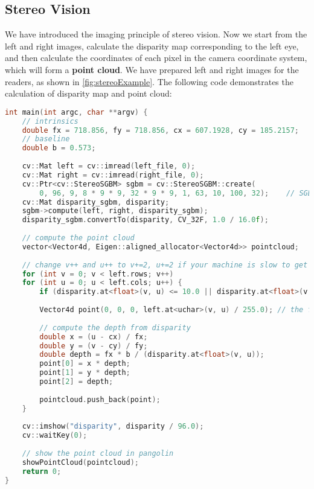 \subsection{Stereo Vision}
We have introduced the imaging principle of stereo vision. Now we start from the left and right images, calculate the disparity map corresponding to the left eye, and then calculate the coordinates of each pixel in the camera coordinate system, which will form a \textbf{point cloud}. We have prepared left and right images for the readers, as shown in \autoref {fig:stereoExample}. The following code demonstrates the calculation of disparity map and point cloud:

\begin{lstlisting}[language=C++,caption=slambook/ch5/stereoVision/stereoVision.cpp (Part)]
int main(int argc, char **argv) {
    // intrinsics
    double fx = 718.856, fy = 718.856, cx = 607.1928, cy = 185.2157;
    // baseline
    double b = 0.573;
    
    cv::Mat left = cv::imread(left_file, 0);
    cv::Mat right = cv::imread(right_file, 0);
    cv::Ptr<cv::StereoSGBM> sgbm = cv::StereoSGBM::create(
        0, 96, 9, 8 * 9 * 9, 32 * 9 * 9, 1, 63, 10, 100, 32);    // SGBM is senstive to parameters
    cv::Mat disparity_sgbm, disparity;
    sgbm->compute(left, right, disparity_sgbm);
    disparity_sgbm.convertTo(disparity, CV_32F, 1.0 / 16.0f);
    
    // compute the point cloud
    vector<Vector4d, Eigen::aligned_allocator<Vector4d>> pointcloud;
    
    // change v++ and u++ to v+=2, u+=2 if your machine is slow to get a sparser cloud
    for (int v = 0; v < left.rows; v++)
    for (int u = 0; u < left.cols; u++) {
        if (disparity.at<float>(v, u) <= 10.0 || disparity.at<float>(v, u) >= 96.0) continue;
        
        Vector4d point(0, 0, 0, left.at<uchar>(v, u) / 255.0); // the first three dimensions are xyz, the 4-th is the color
        
        // compute the depth from disparity
        double x = (u - cx) / fx;
        double y = (v - cy) / fy;
        double depth = fx * b / (disparity.at<float>(v, u));
        point[0] = x * depth;
        point[1] = y * depth;
        point[2] = depth;
        
        pointcloud.push_back(point);
    }
    
    cv::imshow("disparity", disparity / 96.0);
    cv::waitKey(0);
    
    // show the point cloud in pangolin
    showPointCloud(pointcloud);
    return 0;
}
\end{lstlisting}

